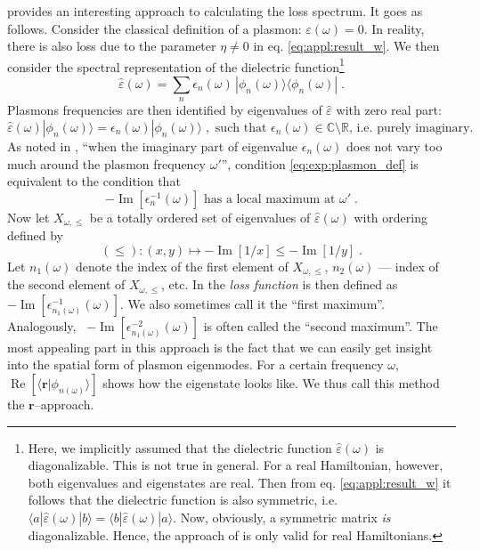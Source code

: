 \documentclass[a4paper,12pt]{article}
\begin{document}
    \cite{plasmonic2015} provides an interesting approach to calculating the loss spectrum. It goes as follows. Consider the classical definition of a plasmon: $\varepsilon(\omega) = 0$. In reality, there is also loss due to the parameter $\eta \neq 0$ in eq. \eqref{eq:appl:result_w}. We then consider the spectral representation of the dielectric function\footnote{ %
    Here, we implicitly assumed that the dielectric function $\hat\varepsilon(\omega)$ is diagonalizable. This is not true in general. For a real Hamiltonian, however, both eigenvalues and eigenstates are real. Then from eq. \eqref{eq:appl:result_w} it follows that the dielectric function is also symmetric, i.e. $\langle a|\hat\varepsilon(\omega)|b \rangle = \langle b|\hat\varepsilon(\omega)|a \rangle$. Now, obviously, a symmetric matrix \textit{is} diagonalizable. Hence, the approach of \cite{plasmonic2015} is only valid for real Hamiltonians.}
    \begin{equation*}
        \hat\varepsilon(\omega) = \sum_n \epsilon_n(\omega) \, |\phi_n(\omega)\rangle\!\langle \phi_n(\omega)|\; .
    \end{equation*}
    Plasmons frequencies are then identified by eigenvalues of $\hat\varepsilon$ with zero real part:
    \begin{equation} \label{eq:exp:plasmon_def}
        \hat\varepsilon(\omega)|\phi_n(\omega)\rangle = \epsilon_n(\omega) |\phi_n(\omega)\rangle\;,\text{ such that }\epsilon_n(\omega) \in \mathbb{C}\setminus\mathbb{R}\text{, i.e. purely imaginary.}
    \end{equation}
    As noted in \cite{andersen2012spatially}, ``when the imaginary part of eigenvalue $\epsilon_n(\omega)$ does not vary too much around the plasmon frequency $\omega'$'', condition \eqref{eq:exp:plasmon_def} is equivalent to the condition that
    \begin{equation} \label{eq:exp:plasmon_qm_condition}
        -\operatorname{Im}[\epsilon_n^{-1}(\omega)] \text{ has a local maximum at }\omega'\;.
    \end{equation}
    Now let $X_{\omega,\leq}$ be a totally ordered set of eigenvalues of $\hat\varepsilon(\omega)$ with ordering defined by
    \begin{equation*}
        (\leq)\!: (x, y) \mapsto -\operatorname{Im}[1 / x] \leq -\operatorname{Im}[1 / y] \;.
    \end{equation*}
    Let $n_1(\omega)$ denote the index of the first element of $X_{\omega,\leq}$, $n_2(\omega)$ --- index of the second element of $X_{\omega,\leq}$, etc. In \cite{plasmonic2015} the \textit{loss function} is then defined as \ $-\operatorname{Im}[\epsilon_{n_1(\omega)}^{-1}(\omega)]$. We also sometimes call it the ``first maximum''. Analogously, \ $-\operatorname{Im}[\epsilon_{n_1(\omega)}^{-2}(\omega)]$ is often called the ``second maximum''.
    The most appealing part in this approach is the fact that we can easily get insight into the spatial form of plasmon eigenmodes. For a certain frequency $\omega$, \ $\operatorname{Re}[\langle\mathbf{r}|\phi_{n(\omega)}\rangle]$ shows how the eigenstate looks like. We thus call this method the $\mathbf{r}$--approach.
\end{document}

